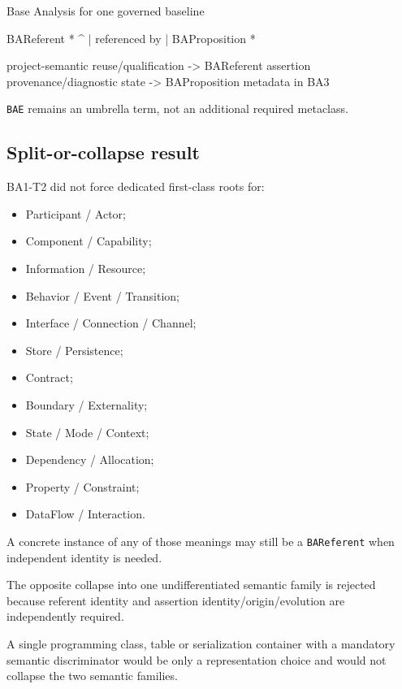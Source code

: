 \documentclass[
  10pt,
]{article}
\newenvironment{Shaded}{}{}
\newcommand{\NormalTok}[1]{#1}
\providecommand{\tightlist}{%
  \setlength{\itemsep}{0pt}\setlength{\parskip}{0pt}}
\begin{document}
\begin{Shaded}
\begin{Highlighting}[]
\NormalTok{Base Analysis for one governed baseline}

\NormalTok{BAReferent *}
\NormalTok{    \^{}}
\NormalTok{    | referenced by}
\NormalTok{    |}
\NormalTok{BAProposition *}

\NormalTok{project{-}semantic reuse/qualification {-}\textgreater{} BAReferent}
\NormalTok{assertion provenance/diagnostic state {-}\textgreater{} BAProposition metadata in BA3}
\end{Highlighting}
\end{Shaded}

\texttt{BAE} remains an umbrella term, not an additional required
metaclass.

\subsection{Split-or-collapse result}\label{split-or-collapse-result}

BA1-T2 did not force dedicated first-class roots for:

\begin{itemize}
\tightlist
\item
  Participant / Actor;
\item
  Component / Capability;
\item
  Information / Resource;
\item
  Behavior / Event / Transition;
\item
  Interface / Connection / Channel;
\item
  Store / Persistence;
\item
  Contract;
\item
  Boundary / Externality;
\item
  State / Mode / Context;
\item
  Dependency / Allocation;
\item
  Property / Constraint;
\item
  DataFlow / Interaction.
\end{itemize}

A concrete instance of any of those meanings may still be a
\texttt{BAReferent} when independent identity is needed.

The opposite collapse into one undifferentiated semantic family is
rejected because referent identity and assertion
identity/origin/evolution are independently required.

A single programming class, table or serialization container with a
mandatory semantic discriminator would be only a representation choice
and would not collapse the two semantic families.
\end{document}
